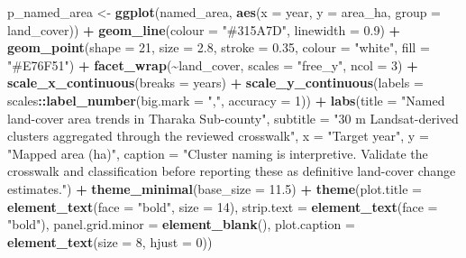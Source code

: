 \documentclass[
]{article}
\newenvironment{Shaded}{\begin{snugshade}}{\end{snugshade}}
\newcommand{\AttributeTok}[1]{\textcolor[rgb]{0.13,0.29,0.53}{#1}}
\newcommand{\DecValTok}[1]{\textcolor[rgb]{0.00,0.00,0.81}{#1}}
\newcommand{\FloatTok}[1]{\textcolor[rgb]{0.00,0.00,0.81}{#1}}
\newcommand{\FunctionTok}[1]{\textcolor[rgb]{0.13,0.29,0.53}{\textbf{#1}}}
\newcommand{\NormalTok}[1]{#1}
\newcommand{\OtherTok}[1]{\textcolor[rgb]{0.56,0.35,0.01}{#1}}
\newcommand{\SpecialCharTok}[1]{\textcolor[rgb]{0.81,0.36,0.00}{\textbf{#1}}}
\newcommand{\StringTok}[1]{\textcolor[rgb]{0.31,0.60,0.02}{#1}}
\begin{document}
\begin{Shaded}
\begin{Highlighting}[]
\NormalTok{  p\_named\_area }\OtherTok{\textless{}{-}} \FunctionTok{ggplot}\NormalTok{(named\_area, }\FunctionTok{aes}\NormalTok{(}\AttributeTok{x =}\NormalTok{ year, }\AttributeTok{y =}\NormalTok{ area\_ha, }\AttributeTok{group =}\NormalTok{ land\_cover)) }\SpecialCharTok{+}
    \FunctionTok{geom\_line}\NormalTok{(}\AttributeTok{colour =} \StringTok{"\#315A7D"}\NormalTok{, }\AttributeTok{linewidth =} \FloatTok{0.9}\NormalTok{) }\SpecialCharTok{+}
    \FunctionTok{geom\_point}\NormalTok{(}\AttributeTok{shape =} \DecValTok{21}\NormalTok{, }\AttributeTok{size =} \FloatTok{2.8}\NormalTok{, }\AttributeTok{stroke =} \FloatTok{0.35}\NormalTok{, }\AttributeTok{colour =} \StringTok{"white"}\NormalTok{, }\AttributeTok{fill =} \StringTok{"\#E76F51"}\NormalTok{) }\SpecialCharTok{+}
    \FunctionTok{facet\_wrap}\NormalTok{(}\SpecialCharTok{\textasciitilde{}}\NormalTok{land\_cover, }\AttributeTok{scales =} \StringTok{"free\_y"}\NormalTok{, }\AttributeTok{ncol =} \DecValTok{3}\NormalTok{) }\SpecialCharTok{+} \FunctionTok{scale\_x\_continuous}\NormalTok{(}\AttributeTok{breaks =}\NormalTok{ years) }\SpecialCharTok{+}
    \FunctionTok{scale\_y\_continuous}\NormalTok{(}\AttributeTok{labels =}\NormalTok{ scales}\SpecialCharTok{::}\FunctionTok{label\_number}\NormalTok{(}\AttributeTok{big.mark =} \StringTok{","}\NormalTok{, }\AttributeTok{accuracy =} \DecValTok{1}\NormalTok{)) }\SpecialCharTok{+}
    \FunctionTok{labs}\NormalTok{(}\AttributeTok{title =} \StringTok{"Named land{-}cover area trends in Tharaka Sub{-}county"}\NormalTok{,}
         \AttributeTok{subtitle =} \StringTok{"30 m Landsat{-}derived clusters aggregated through the reviewed crosswalk"}\NormalTok{,}
         \AttributeTok{x =} \StringTok{"Target year"}\NormalTok{, }\AttributeTok{y =} \StringTok{"Mapped area (ha)"}\NormalTok{,}
         \AttributeTok{caption =} \StringTok{"Cluster naming is interpretive. Validate the crosswalk and classification before reporting these as definitive land{-}cover change estimates."}\NormalTok{) }\SpecialCharTok{+}
    \FunctionTok{theme\_minimal}\NormalTok{(}\AttributeTok{base\_size =} \FloatTok{11.5}\NormalTok{) }\SpecialCharTok{+} \FunctionTok{theme}\NormalTok{(}\AttributeTok{plot.title =} \FunctionTok{element\_text}\NormalTok{(}\AttributeTok{face =} \StringTok{"bold"}\NormalTok{, }\AttributeTok{size =} \DecValTok{14}\NormalTok{),}
      \AttributeTok{strip.text =} \FunctionTok{element\_text}\NormalTok{(}\AttributeTok{face =} \StringTok{"bold"}\NormalTok{), }\AttributeTok{panel.grid.minor =} \FunctionTok{element\_blank}\NormalTok{(), }\AttributeTok{plot.caption =} \FunctionTok{element\_text}\NormalTok{(}\AttributeTok{size =} \DecValTok{8}\NormalTok{, }\AttributeTok{hjust =} \DecValTok{0}\NormalTok{))}

\end{Highlighting}
\end{Shaded}
\end{document}

